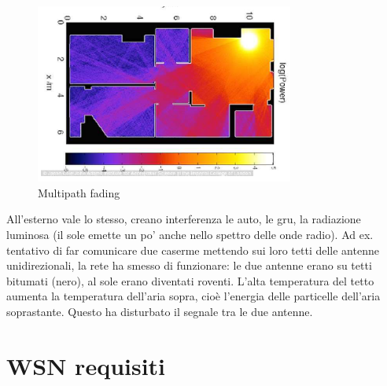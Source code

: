 \documentclass[12pt,italian]{report}
\begin{document}
\begin{figure}[h]
	\centering
    \includegraphics[width=85mm]{img/mpathfad.PNG}
    \caption{Multipath fading}
    \label{fig:mfad}
\end{figure}

All'esterno vale lo stesso, creano interferenza le auto, le gru, la radiazione luminosa (il sole emette un po' anche nello spettro delle onde radio). Ad ex. tentativo di far comunicare due caserme mettendo sui loro tetti delle antenne unidirezionali, la rete ha smesso di funzionare: le due antenne erano su tetti bitumati (nero), al sole erano diventati roventi. L'alta temperatura del tetto aumenta la temperatura dell'aria sopra, cioè l'energia delle particelle dell'aria soprastante. Questo ha disturbato il segnale tra le due antenne. 

\section{WSN requisiti}
\label{sec:WSNreq}
\end{document}
